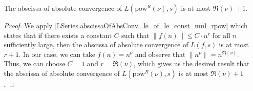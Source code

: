 \begin{theorem}
\label{abscissa_powR_le}
\leanok
The abscissa of absolute convergence of $L(\text{pow}^R(\nu), s)$ is at most $\Re(\nu) + 1$.
\end{theorem}
\begin{proof}
\leanok
We apply \ref{LSeries.abscissaOfAbsConv_le_of_le_const_mul_rpow} which states that if there exists a constant $C$ such that $\|f(n)\| \leq C \cdot n^r$ for all $n$ sufficiently large, then the abscissa of absolute convergence of $L(f, s)$ is at most $r + 1$. In our case, we can take $f(n) = n^\nu$ and observe that $\|n^\nu\| = n^{\Re(\nu)}$. Thus, we can choose $C = 1$ and $r = \Re(\nu)$, which gives us the desired result that the abscissa of absolute convergence of $L(\text{pow}^R(\nu), s)$ is at most $\Re(\nu) + 1$.
\end{proof}
